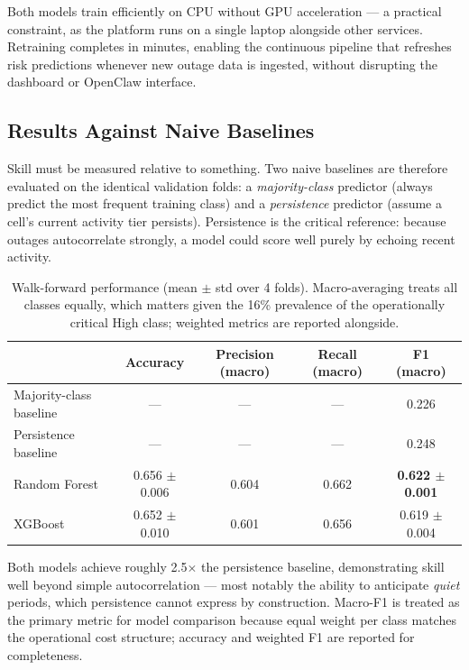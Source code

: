Both models train efficiently on CPU without GPU acceleration --- a practical constraint, as the platform runs on a single laptop alongside other services. Retraining completes in minutes, enabling the continuous pipeline that refreshes risk predictions whenever new outage data is ingested, without disrupting the dashboard or OpenClaw interface.

\subsection{Results Against Naive Baselines}

Skill must be measured relative to something. Two naive baselines are therefore evaluated on the identical validation folds: a \emph{majority-class} predictor (always predict the most frequent training class) and a \emph{persistence} predictor (assume a cell's current activity tier persists). Persistence is the critical reference: because outages autocorrelate strongly, a model could score well purely by echoing recent activity.

\begin{table}[htbp]
    \centering
    \caption{Walk-forward performance (mean $\pm$ std over 4 folds). Macro-averaging treats all classes equally, which matters given the 16\% prevalence of the operationally critical High class; weighted metrics are reported alongside.}
    \label{tab:risk_results}
    \begin{tabular}{lcccc}
        \toprule
         & \textbf{Accuracy} & \textbf{Precision (macro)} & \textbf{Recall (macro)} & \textbf{F1 (macro)} \\
        \midrule
        Majority-class baseline & --- & --- & --- & 0.226 \\
        Persistence baseline    & --- & --- & --- & 0.248 \\
        Random Forest           & 0.656 $\pm$ 0.006 & 0.604 & 0.662 & \textbf{0.622 $\pm$ 0.001} \\
        XGBoost                 & 0.652 $\pm$ 0.010 & 0.601 & 0.656 & 0.619 $\pm$ 0.004 \\
        \bottomrule
    \end{tabular}
\end{table}

Both models achieve roughly 2.5$\times$ the persistence baseline, demonstrating skill well beyond simple autocorrelation --- most notably the ability to anticipate \emph{quiet} periods, which persistence cannot express by construction. Macro-F1 is treated as the primary metric for model comparison because equal weight per class matches the operational cost structure; accuracy and weighted F1 are reported for completeness. %

